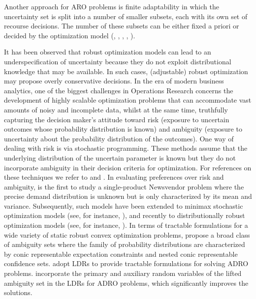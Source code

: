 \documentclass[fleqn,orsc,blindrev]{informs4}
\begin{document}
	Another approach for ARO problems is finite adaptability in which the uncertainty set is split into a number of smaller subsets, each with its own set of recourse decisions. The number of these subsets can be either fixed a priori or decided by the optimization model (\cite{vkr11}, \cite{bc10}, \cite{hkw14}, \cite{pd16}, \cite{bd16a}).
	
	It has been observed that robust optimization models can lead to an underspecification of uncertainty because they do not exploit distributional knowledge that may be available. In such cases, (adjustable) robust optimization may propose overly conservative decisions. In the era of modern business analytics, one of the biggest challenges in Operations Research concerns the development of highly scalable optimization problems that can accommodate vast amounts of noisy and incomplete data, whilst at the same time, truthfully capturing the decision maker's attitude toward risk (exposure to uncertain outcomes whose probability distribution is known) and ambiguity (exposure to uncertainty about the probability distribution of the outcomes). One way of dealing with risk is via stochastic programming. These methods assume that the underlying distribution of the uncertain parameter is known but they do not incorporate ambiguity in their decision criteria for optimization. For references on these techniques we refer to \cite{bl97} and \cite{kw95}. In evaluating preferences over risk and ambiguity, \cite{scarf58} is the first to study a single-product Newsvendor problem where the precise demand distribution is unknown but is only characterized by its mean and variance. Subsequently, such models have been extended to minimax stochastic optimization models (see, for instance, \cite{z66,be95,sk02,sa04}), and recently to distributionally robust optimization models (see, for instance, \cite{css07,cs09,p07,dy10,xm12}). In terms of tractable formulations for a wide variety of static robust convex optimization problems, \cite{wks14} propose a broad class of ambiguity  {sets} where the family of probability distributions are characterized by conic representable expectation constraints and nested conic representable confidence sets. \cite{css07} adopt LDRs to provide tractable formulations for solving ADRO problems. \cite{bsz17} incorporate the primary and auxiliary random variables of the lifted ambiguity set in the LDRs for ADRO problems, which significantly improves the solutions.
	
\end{document}
